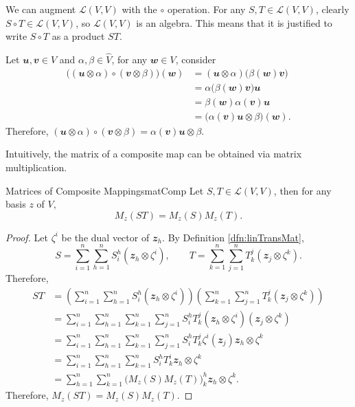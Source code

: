 \documentclass[math, code]{amznotes}
\theoremstyle{remark}
\begin{document}
We can augment $\mathcal{L}(V, V)$ with the $\circ$ operation. For any $S, T \in \mathcal{L}(V, V)$, clearly $S \circ T \in \mathcal{L}(V, V)$, so $\mathcal{L}(V, V)$ is an algebra. This means that it is justified to write $S \circ T$ as a product $ST$.

Let $\mathbfit{u}, \mathbfit{v} \in V$ and $\alpha, \beta \in \widehat{V}$, for any $\mathbfit{w} \in V$, consider
\begin{align*}
    \bigl((\mathbfit{u} \otimes \alpha) \circ (\mathbfit{v} \otimes \beta)\bigr)(\mathbfit{w}) & = (\mathbfit{u} \otimes \alpha)\bigl(\beta(\mathbfit{w})\mathbfit{v}\bigr) \\
    & = \alpha\bigl(\beta(\mathbfit{w})\mathbfit{v}\bigr)\mathbfit{u} \\
    & = \beta(\mathbfit{w})\alpha(\mathbfit{v})\mathbfit{u} \\
    & = \bigl(\alpha(\mathbfit{v})\mathbfit{u} \otimes \beta\bigr)(\mathbfit{w}).
\end{align*}
Therefore, $(\mathbfit{u} \otimes \alpha) \circ (\mathbfit{v} \otimes \beta) = \alpha(\mathbfit{v})\mathbfit{u} \otimes \beta$.

Intuitively, the matrix of a composite map can be obtained via matrix multiplication.
\begin{probox}{Matrices of Composite Mappings}{matComp}
    Let $S, T \in \mathcal{L}(V, V)$, then for any basis $z$ of $V$, 
    \begin{equation*}
        M_z(ST) = M_z(S)M_z(T).
    \end{equation*}
    \tcblower
    \begin{proof}
        Let $\zeta^i$ be the dual vector of $\mathbfit{z}_h$. By Definition \ref{dfn:linTransMat}, 
        \begin{equation*}
            S = \sum_{i = 1}^{n}\sum_{h = 1}^{n}S^h_i(\mathbfit{z}_h \otimes \zeta^i), \qquad T = \sum_{k = 1}^{n}\sum_{j = 1}^{n}T^j_k(\mathbfit{z}_j \otimes \zeta^k).
        \end{equation*}
        Therefore,
        \begin{align*}
            ST & = \left(\sum_{i = 1}^{n}\sum_{h = 1}^{n}S^h_i(\mathbfit{z}_h \otimes \zeta^i)\right)\left(\sum_{k = 1}^{n}\sum_{j = 1}^{n}T^j_k(\mathbfit{z}_j \otimes \zeta^k)\right) \\
            & = \sum_{i = 1}^{n}\sum_{h = 1}^{n}\sum_{k = 1}^{n}\sum_{j = 1}^{n}S^h_iT^j_k(\mathbfit{z}_h \otimes \zeta^i)(\mathbfit{z}_j \otimes \zeta^k) \\
            & = \sum_{i = 1}^{n}\sum_{h = 1}^{n}\sum_{k = 1}^{n}\sum_{j = 1}^{n}S^h_iT^j_k\zeta^i(\mathbfit{z}_j)\mathbfit{z}_h \otimes \zeta^k \\
            & = \sum_{i = 1}^{n}\sum_{h = 1}^{n}\sum_{k = 1}^{n}S^h_iT^i_k\mathbfit{z}_h \otimes \zeta^k \\
            & = \sum_{h = 1}^{n}\sum_{k = 1}^{n}\bigl(M_z(S)M_z(T)\bigr)^h_k\mathbfit{z}_h \otimes \zeta^k.
        \end{align*}
        Therefore, $M_z(ST) = M_z(S)M_z(T)$.
    \end{proof}
\end{probox}
\end{document}

